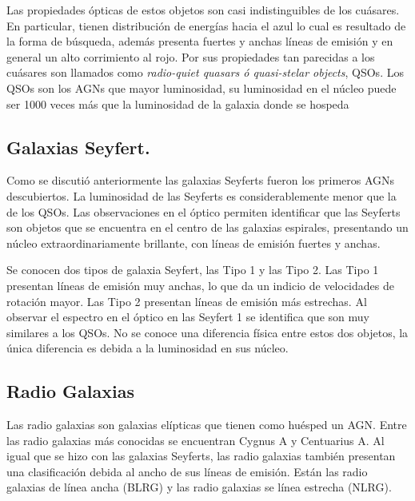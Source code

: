 Las propiedades ópticas de estos objetos son casi indistinguibles de los cuásares. En particular, tienen distribución de energías hacia el azul lo cual es resultado de la forma de búsqueda, además presenta fuertes y anchas líneas de emisión y en general un alto corrimiento al rojo. Por sus propiedades tan parecidas a los cuásares son llamados como {\textit{radio-quiet quasars ó quasi-stelar objects}}, QSOs. Los QSOs son los AGNs que mayor luminosidad, su luminosidad en el núcleo puede ser 1000 veces más que la luminosidad de la galaxia donde se hospeda 

	\subsection{Galaxias Seyfert.}
	\label{subsec:Seyfert_Galaxy}

Como se discutió anteriormente las galaxias Seyferts fueron los primeros AGNs descubiertos. La luminosidad de las Seyferts es considerablemente menor que la de los QSOs. Las observaciones en el óptico permiten identificar que las Seyferts son objetos que se encuentra en el centro de las galaxias espirales, presentando un núcleo extraordinariamente brillante, con líneas de emisión  fuertes y anchas.

Se conocen dos tipos de galaxia Seyfert, las Tipo 1 y las Tipo 2. Las Tipo 1 presentan líneas de emisión muy anchas, lo que da un indicio de velocidades de rotación mayor. Las Tipo 2 presentan líneas de emisión más estrechas. Al observar el espectro en el óptico en las Seyfert 1 se identifica que son muy similares a los QSOs. No se conoce una diferencia física entre estos dos objetos, la única diferencia es debida a la luminosidad en sus núcleo. 


	\subsection{Radio Galaxias}
	\label{subsec:Radio_Galaxy}

Las radio galaxias son galaxias elípticas que tienen como huésped un AGN. Entre las radio galaxias más conocidas se encuentran Cygnus A y Centuarius A. Al igual que se hizo con las galaxias Seyferts, las radio galaxias también presentan una clasificación debida al ancho de sus  líneas de emisión. Están las radio galaxias de línea ancha (BLRG) y las radio galaxias se línea estrecha (NLRG).

